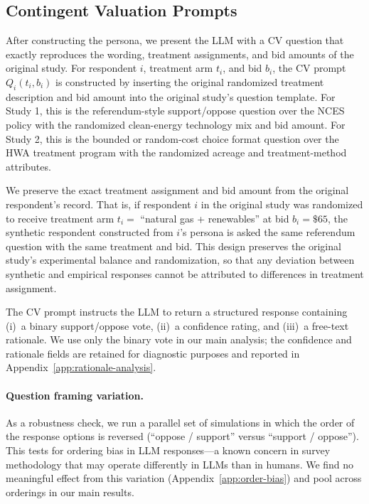 \documentclass[12pt]{article}
\begin{document}
\subsection{Contingent Valuation Prompts}\label{sec:methods-cv-prompts}

After constructing the persona, we present the LLM with a CV question that exactly reproduces the wording, treatment assignments, and bid amounts of the original study. For respondent $i$, treatment arm $t_i$, and bid $b_i$, the CV prompt $Q_i(t_i, b_i)$ is constructed by inserting the original randomized treatment description and bid amount into the original study's question template. For Study 1, this is the referendum-style support/oppose question over the NCES policy with the randomized clean-energy technology mix and bid amount. For Study 2, this is the bounded or random-cost choice format question over the HWA treatment program with the randomized acreage and treatment-method attributes.

We preserve the exact treatment assignment and bid amount from the original respondent's record. That is, if respondent $i$ in the original study was randomized to receive treatment arm $t_i = $ ``natural gas + renewables'' at bid $b_i = \$65$, the synthetic respondent constructed from $i$'s persona is asked the same referendum question with the same treatment and bid. This design preserves the original study's experimental balance and randomization, so that any deviation between synthetic and empirical responses cannot be attributed to differences in treatment assignment.

The CV prompt instructs the LLM to return a structured response containing (i)~a binary support/oppose vote, (ii)~a confidence rating, and (iii)~a free-text rationale. We use only the binary vote in our main analysis; the confidence and rationale fields are retained for diagnostic purposes and reported in Appendix~\ref{app:rationale-analysis}.

\paragraph{Question framing variation.} As a robustness check, we run a parallel set of simulations in which the order of the response options is reversed (``oppose / support'' versus ``support / oppose''). This tests for ordering bias in LLM responses---a known concern in survey methodology that may operate differently in LLMs than in humans. We find no meaningful effect from this variation (Appendix~\ref{app:order-bias}) and pool across orderings in our main results.
\end{document}
